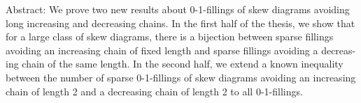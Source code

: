 \documentclass[12pt]{article}
\begin{document}
Abstract: We prove two new results about 0-1-fillings of skew diagrams avoiding
long increasing and decreasing chains. In the first half of the thesis, we show
that for a large class of skew diagrams, there is a bijection between sparse fillings
avoiding an increasing chain of fixed length and sparse fillings avoiding a decreas-
ing chain of the same length. In the second half, we extend a known inequality
between the number of sparse 0-1-fillings of skew diagrams avoiding an increasing
chain of length 2 and a decreasing chain of length 2 to all 0-1-fillings.
\end{document}
